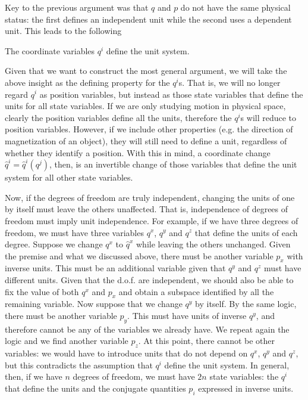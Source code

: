 Key to the previous argument was that $q$ and $p$ do not have the same physical status: the first defines an independent unit while the second uses a dependent unit. This leads to the following
\begin{insight}
	The coordinate variables $q^i$ define the unit system.
\end{insight}
Given that we want to construct the most general argument, we will take the above insight as the defining property for the $q^i$s. That is, we will no longer regard $q^i$ as position variables, but instead as those state variables that define the units for all state variables. If we are only studying motion in physical space, clearly the position variables define all the units, therefore the $q^i$s will reduce to position variables. However, if we include other properties (e.g. the direction of magnetization of an object), they will still need to define a unit, regardless of whether they identify a position. With this in mind, a coordinate change $\hat{q}^i = \hat{q}^i(q^j)$, then, is an invertible change of those variables that define the unit system for all other state variables.


Now, if the degrees of freedom are truly independent, changing the units of one by itself must leave the others unaffected. That is, independence of degrees of freedom must imply unit independence. For example, if we have three degrees of freedom, we must have three variables $q^x$, $q^y$ and $q^z$ that define the units of each degree. Suppose we change $q^x$ to $\hat{q}^x$ while leaving the others unchanged. Given the premise and what we discussed above, there must be another variable $p_x$ with inverse units. This must be an additional variable given that $q^y$ and $q^z$ must have different units. Given that the d.o.f. are independent, we should also be able to fix the value of both $q^x$ and $p_x$ and obtain a subspace identified by all the remaining variable. Now suppose that we change $q^y$ by itself. By the same logic, there must be another variable $p_y$. This must have units of inverse $q^y$, and therefore cannot be any of the variables we already have. We repeat again the logic and we find another variable $p_z$. At this point, there cannot be other variables: we would have to introduce units that do not depend on $q^x$, $q^y$ and $q^z$, but this contradicts the assumption that $q^i$ define the unit system. In general, then, if we have $n$ degrees of freedom, we must have $2n$ state variables: the $q^i$ that define the units and the conjugate quantities $p_i$ expressed in inverse units.

